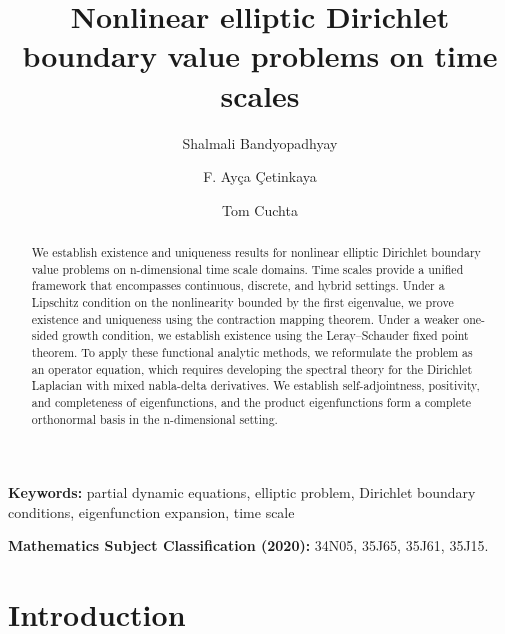 \documentclass{article}
\numberwithin{equation}{section}
\numberwithin{theorem}{section}
\begin{document}
\title{Nonlinear elliptic Dirichlet boundary value problems on time scales}

\author[1]{Shalmali Bandyopadhyay}
\author[2]{F. Ay\c{c}a \c{C}etinkaya}
\author[3]{Tom Cuchta}
\setcounter{Maxaffil}{0}
\renewcommand\Affilfont{\itshape\small}
\date{}

\vspace{5mm}

\maketitle
\begin{abstract}
We establish existence and uniqueness results for nonlinear elliptic Dirichlet boundary value problems on n-dimensional time scale domains. Time scales provide a unified framework that encompasses continuous, discrete, and hybrid settings. Under a Lipschitz condition on the nonlinearity bounded by the first eigenvalue, we prove existence and uniqueness using the contraction mapping theorem. Under a weaker one-sided growth condition, we establish existence using the Leray--Schauder fixed point theorem. To apply these functional analytic methods, we reformulate the problem as an operator equation, which requires developing the spectral theory for the Dirichlet Laplacian with mixed nabla-delta derivatives. We establish self-adjointness, positivity, and completeness of eigenfunctions, and the product eigenfunctions form a complete orthonormal basis in the n-dimensional setting.
\end{abstract}
\vspace{3mm}
\noindent\textbf{Keywords:} partial dynamic equations, elliptic problem, Dirichlet boundary conditions, eigenfunction expansion, time scale

\noindent\textbf{Mathematics Subject Classification (2020):} 34N05, 35J65, 35J61, 35J15.

\section{Introduction}\label{sec:intro}
\end{document}
